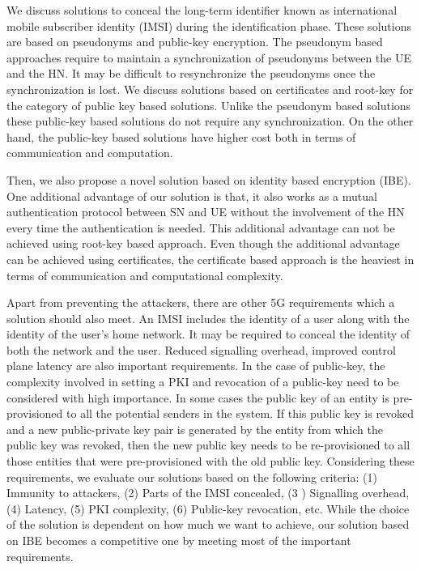 \documentclass[runningheads,a4paper]{llncs} %
\begin{document}
We discuss solutions to conceal the long-term identifier known as international mobile subscriber identity (IMSI) during the identification phase. These solutions are based on pseudonyms and public-key encryption. The pseudonym based approaches require to maintain a synchronization of pseudonyms between the UE and the HN. It may be difficult to resynchronize the pseudonyms once the synchronization is lost. We discuss solutions based on certificates and root-key for the category of public key based solutions. Unlike the pseudonym based solutions these public-key based solutions do not require any synchronization. On the other hand, the public-key based solutions have higher cost both in terms of communication and computation. 

Then, we also propose a novel solution based on identity based encryption (IBE). One additional advantage of our solution is that, it also works as a mutual authentication protocol between SN and UE without the involvement of the HN every time the authentication is needed. This additional advantage can not be achieved using root-key based approach. Even though the additional advantage can be achieved using certificates, the certificate based approach is the heaviest in terms of communication and computational complexity.

Apart from preventing the attackers, there are other 5G requirements which a solution should also meet. An IMSI includes the identity of a user along with the identity of the user's home network. It may be required to conceal the identity of both the network and the user. Reduced signalling overhead, improved control plane latency are also important requirements. In the case of public-key, the complexity involved in setting a PKI and revocation of a public-key need to be considered with high importance. In some cases the public key of an entity is pre-provisioned to all the potential senders in the system. If this public key is revoked and a new public-private key pair is generated by the entity from which the public key was revoked, then the new public key needs to be re-provisioned to all those entities that were pre-provisioned with the old public key. Considering these requirements, we evaluate our solutions based on the following criteria: (1) Immunity to attackers, (2) Parts of the IMSI concealed, (3 ) Signalling overhead, (4) Latency, (5) PKI complexity, (6) Public-key revocation, etc. While the choice of the solution is dependent on how much we want to achieve, our solution based on IBE becomes a competitive one by meeting most of the important requirements.
\end{document}

